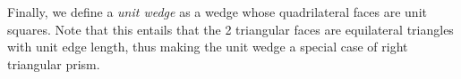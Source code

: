 Finally, we define a \emph{unit wedge} as a wedge whose quadrilateral
faces are unit squares. Note that this entails that the 2 triangular
faces are equilateral triangles with unit edge length, thus making the
unit wedge a special case of right triangular prism.
\newcommand{\othermetrictable}[8]{%
  \begin{center} 
  \begin{tabular}{ll}
    \multicolumn{2}{r}{\textbf{\sffamily\Large #1}}\\\hline
    Dimension:                           & #2\\ 
    Acceptable Range:                    & #3\\ 
    Normal Range:                        & #4\\ 
    Full Range:                          & #5\\ 
    $q$ for unit element:                & #6\\
    Reference:                           & #7\\
    \verd\ function:       & \texttt{#8}\\ \hline
  \end{tabular} 
  \end{center}
}

\clearpage
\newpage 
\newpage 
\newpage 
